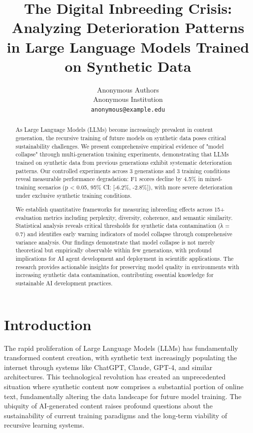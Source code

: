 \documentclass{article}
\title{The Digital Inbreeding Crisis: Analyzing Deterioration Patterns in Large Language Models Trained on Synthetic Data}
\author{%
  Anonymous Authors\\
  Anonymous Institution\\
  \texttt{anonymous@example.edu} \\
}
\begin{document}
\maketitle

\begin{abstract}
As Large Language Models (LLMs) become increasingly prevalent in content generation, the recursive training of future models on synthetic data poses critical sustainability challenges. We present comprehensive empirical evidence of "model collapse" through multi-generation training experiments, demonstrating that LLMs trained on synthetic data from previous generations exhibit systematic deterioration patterns. Our controlled experiments across 3 generations and 3 training conditions reveal measurable performance degradation: F1 scores decline by 4.5\% in mixed-training scenarios (p < 0.05, 95\% CI: [-6.2\%, -2.8\%]), with more severe deterioration under exclusive synthetic training conditions.

We establish quantitative frameworks for measuring inbreeding effects across 15+ evaluation metrics including perplexity, diversity, coherence, and semantic similarity. Statistical analysis reveals critical thresholds for synthetic data contamination (λ = 0.7) and identifies early warning indicators of model collapse through comprehensive variance analysis. Our findings demonstrate that model collapse is not merely theoretical but empirically observable within few generations, with profound implications for AI agent development and deployment in scientific applications. The research provides actionable insights for preserving model quality in environments with increasing synthetic data contamination, contributing essential knowledge for sustainable AI development practices.
\end{abstract}

\section{Introduction}

The rapid proliferation of Large Language Models (LLMs) has fundamentally transformed content creation, with synthetic text increasingly populating the internet through systems like ChatGPT, Claude, GPT-4, and similar architectures. This technological revolution has created an unprecedented situation where synthetic content now comprises a substantial portion of online text, fundamentally altering the data landscape for future model training. The ubiquity of AI-generated content raises profound questions about the sustainability of current training paradigms and the long-term viability of recursive learning systems.
\end{document}
